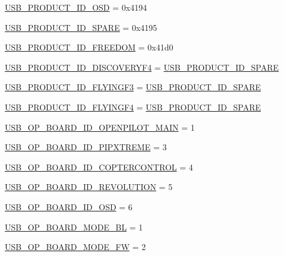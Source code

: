 \begin{DoxyCompactItemize}
\item 
\hyperlink{group___p_i_o_s___u_s_b___d_e_f_s_ga0d8c174bc113f139b562721418dcf51a}{\-U\-S\-B\-\_\-\-P\-R\-O\-D\-U\-C\-T\-\_\-\-I\-D\-\_\-\-O\-S\-D} = 0x4194
\item 
\hyperlink{group___p_i_o_s___u_s_b___d_e_f_s_gaf82c7dc922fae0cffa60e95acc05b46c}{\-U\-S\-B\-\_\-\-P\-R\-O\-D\-U\-C\-T\-\_\-\-I\-D\-\_\-\-S\-P\-A\-R\-E} = 0x4195
\item 
\hyperlink{group___p_i_o_s___u_s_b___d_e_f_s_ga57db1fdaa0e9bbaf565aaccd96f44251}{\-U\-S\-B\-\_\-\-P\-R\-O\-D\-U\-C\-T\-\_\-\-I\-D\-\_\-\-F\-R\-E\-E\-D\-O\-M} = 0x41d0
\item 
\hyperlink{group___p_i_o_s___u_s_b___d_e_f_s_ga0285a5935c9e1b917d56f3390abb7517}{\-U\-S\-B\-\_\-\-P\-R\-O\-D\-U\-C\-T\-\_\-\-I\-D\-\_\-\-D\-I\-S\-C\-O\-V\-E\-R\-Y\-F4} = \hyperlink{group___p_i_o_s___u_s_b___d_e_f_s_gaf82c7dc922fae0cffa60e95acc05b46c}{\-U\-S\-B\-\_\-\-P\-R\-O\-D\-U\-C\-T\-\_\-\-I\-D\-\_\-\-S\-P\-A\-R\-E}
\item 
\hyperlink{group___p_i_o_s___u_s_b___d_e_f_s_gaf04d136e7427c1cacd8b966f5629208d}{\-U\-S\-B\-\_\-\-P\-R\-O\-D\-U\-C\-T\-\_\-\-I\-D\-\_\-\-F\-L\-Y\-I\-N\-G\-F3} = \hyperlink{group___p_i_o_s___u_s_b___d_e_f_s_gaf82c7dc922fae0cffa60e95acc05b46c}{\-U\-S\-B\-\_\-\-P\-R\-O\-D\-U\-C\-T\-\_\-\-I\-D\-\_\-\-S\-P\-A\-R\-E}
\item 
\hyperlink{group___p_i_o_s___u_s_b___d_e_f_s_ga987acf80d4e9c88c4e1621d5215c1f58}{\-U\-S\-B\-\_\-\-P\-R\-O\-D\-U\-C\-T\-\_\-\-I\-D\-\_\-\-F\-L\-Y\-I\-N\-G\-F4} = \hyperlink{group___p_i_o_s___u_s_b___d_e_f_s_gaf82c7dc922fae0cffa60e95acc05b46c}{\-U\-S\-B\-\_\-\-P\-R\-O\-D\-U\-C\-T\-\_\-\-I\-D\-\_\-\-S\-P\-A\-R\-E}
\item 
\hyperlink{group___p_i_o_s___u_s_b___d_e_f_s_ga593ac31097712501cf540cb304957cd9}{\-U\-S\-B\-\_\-\-O\-P\-\_\-\-B\-O\-A\-R\-D\-\_\-\-I\-D\-\_\-\-O\-P\-E\-N\-P\-I\-L\-O\-T\-\_\-\-M\-A\-I\-N} = 1
\item 
\hyperlink{group___p_i_o_s___u_s_b___d_e_f_s_ga45e12a7abdf8972bd81fd6ed15a6ba8a}{\-U\-S\-B\-\_\-\-O\-P\-\_\-\-B\-O\-A\-R\-D\-\_\-\-I\-D\-\_\-\-P\-I\-P\-X\-T\-R\-E\-M\-E} = 3
\item 
\hyperlink{group___p_i_o_s___u_s_b___d_e_f_s_ga2afd7c867dd287434af691f95fa05e1e}{\-U\-S\-B\-\_\-\-O\-P\-\_\-\-B\-O\-A\-R\-D\-\_\-\-I\-D\-\_\-\-C\-O\-P\-T\-E\-R\-C\-O\-N\-T\-R\-O\-L} = 4
\item 
\hyperlink{group___p_i_o_s___u_s_b___d_e_f_s_ga126420e50e08d0c3b6233ecf663a9d51}{\-U\-S\-B\-\_\-\-O\-P\-\_\-\-B\-O\-A\-R\-D\-\_\-\-I\-D\-\_\-\-R\-E\-V\-O\-L\-U\-T\-I\-O\-N} = 5
\item 
\hyperlink{group___p_i_o_s___u_s_b___d_e_f_s_gae420a56f75b7fa936432aa62cbd01394}{\-U\-S\-B\-\_\-\-O\-P\-\_\-\-B\-O\-A\-R\-D\-\_\-\-I\-D\-\_\-\-O\-S\-D} = 6
\item 
\hyperlink{group___p_i_o_s___u_s_b___d_e_f_s_ga767b27480b13ddffa436173c56187ee8}{\-U\-S\-B\-\_\-\-O\-P\-\_\-\-B\-O\-A\-R\-D\-\_\-\-M\-O\-D\-E\-\_\-\-B\-L} = 1
\item 
\hyperlink{group___p_i_o_s___u_s_b___d_e_f_s_ga49052e38fe7f9608cde64c04bf6fbd9a}{\-U\-S\-B\-\_\-\-O\-P\-\_\-\-B\-O\-A\-R\-D\-\_\-\-M\-O\-D\-E\-\_\-\-F\-W} = 2
\end{DoxyCompactItemize}


